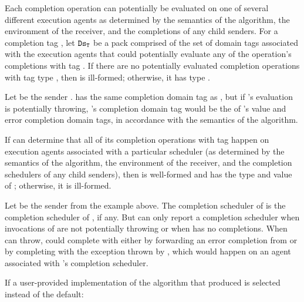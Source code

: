 \pnum
Each completion operation can potentially be evaluated
on one of several different execution agents
as determined by the semantics of the algorithm,
the environment of the receiver, and
the completions of any child senders.
For a completion tag ,
let $\tcode{Ds}_{\tcode{T}}$ be a pack comprised of the set of domain tags
associated with the execution agents that could potentially evaluate
any of the operation's completions with tag .
If there are no potentially evaluated completion operations
with tag type ,
then  is ill-formed;
otherwise, it has type
.
\begin{example}
Let  be the sender .
 has the same  completion domain tag as ,
but if 's evaluation is potentially throwing,
's  completion domain tag would be
the  of 's value and error completion domain tags,
in accordance with the semantics of the  algorithm.
\end{example}

\pnum
If  can determine that all of its completion operations
with tag  happen on execution agents
associated with a particular scheduler 
(as determined by the semantics of the algorithm,
the environment of the receiver, and
the completion schedulers of any child senders),
then 
is well-formed and has the type and value of ;
otherwise, it is ill-formed.
\begin{example}
Let  be the sender from the example above.
The  completion scheduler of  is
the  completion scheduler of , if any.
But  can only report a  completion scheduler
when invocations of  are not potentially throwing or
when  has no  completions.
When  can throw,
 could complete with  either
by forwarding an error completion from  or
by completing with the exception thrown by ,
which would happen on an agent associated with 's
 completion scheduler.
\end{example}

\pnum
If a user-provided implementation of the algorithm
that produced  is selected instead of the default:

